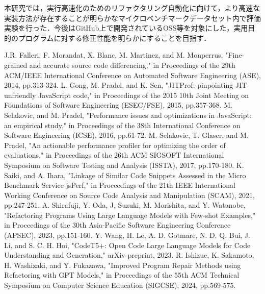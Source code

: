 \documentclass[submit,techrep,noauthor]{ipsj}
\begin{document}
本研究では，実行高速化のためのリファクタリング自動化に向けて，より高速な実装方法が存在することが明らかなマイクロベンチマークデータセット内で評価実験を行った．今後はGitHub上で開発されているOSS等を対象にした，実用目的のプログラムに対する修正性能を明らかにすることを目指す．



\begin{thebibliography}{10}

    J.R. Falleri, F. Morandat, X. Blanc, M. Martinez, and M. Monperrus,
    "Fine-grained and accurate source code differencing,"
    in Proceedings of the 29th ACM/IEEE International Conference on Automated Software Engineering (ASE),
    2014,
    pp.313-324.
    L. Gong, M. Pradel, and K. Sen,
    "JITProf: pinpointing JIT-unfriendly JavaScript code,"
    in Proceedings of the 2015 10th Joint Meeting on Foundations of Software Engineering (ESEC/FSE),
    2015,
    pp.357-368.
    M. Selakovic, and M. Pradel,
    "Performance issues and optimizations in JavaScript: an empirical study,"
    in Proceedings of the 38th International Conference on Software Engineering (ICSE),
    2016,
    pp.61-72.
    M. Selakovic, T. Glaser, and M. Pradel,
    "An actionable performance profiler for optimizing the order of evaluations,"
    in Proceedings of the 26th ACM SIGSOFT International Symposium on Software Testing and Analysis (ISSTA),
    2017,
    pp.170-180.
    K. Saiki, and A. Ihara,
    "Linkage of Similar Code Snippets Assessed in the Micro Benchmark Service jsPerf,"
    in Proceedings of the 21th IEEE International Working Conference on Source Code Analysis and Manipulation (SCAM),
    2021,
    pp.247-251.
    A. Shirafuji, Y. Oda, J, Suzuki, M. Morishita, and Y. Watanobe,
    "Refactoring Programs Using Large Language Models with Few-shot Examples,"
    in Proceedings of the 30th Asia-Pacific Software Engineering Conference (APSEC),
    2023,
    pp.151-160.
    Y. Wang, H. Le, A. D. Gotmare, N. D. Q. Bui, J. Li, and S. C. H. Hoi,
    "CodeT5+: Open Code Large Language Models for Code Understanding and Generation,"
    arXiv preprint,
    2023.
    R. Ishizue, K. Sakamoto, H. Washizaki, and Y. Fukazawa,
    "Improved Program Repair Methods using Refactoring with GPT Models,"
    in Proceedings of the 55th ACM Technical Symposium on Computer Science Education (SIGCSE),
    2024,
    pp.569-575.

\end{thebibliography}
\end{document}
